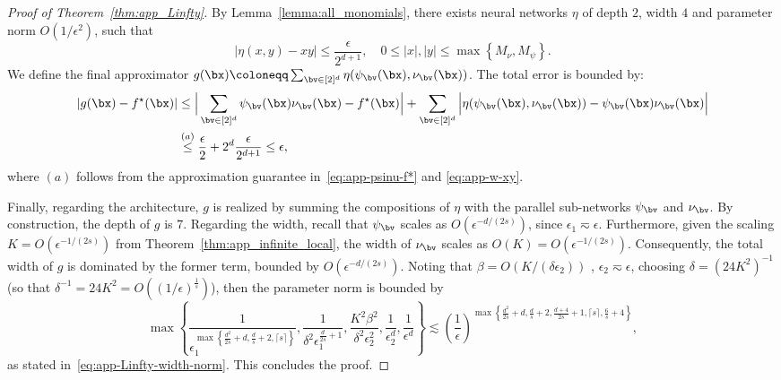 \documentclass[11pt]{article}
\begin{document}
\begin{proof}[Proof of Theorem~\ref{thm:app_Linfty}]
    By Lemma~\ref{lemma:all_monomials}, there exists neural networks $\eta$ of depth $2$, width $4$ and parameter norm $O(1 / \epsilon^2)$, such that 
    \begin{equation}
        |\eta(x,y) - xy| \leq \frac{\epsilon}{2^{d+1}}, \quad 0 \leq |x|, |y| \leq \max \left\{ M_{\nu}, M_{\psi}\right\}.
        \label{eq:app-w-xy}
    \end{equation}
    We define the final approximator $g(\bx) \coloneqq  \sum_{\bv \in [2]^d} \eta(\psi_{\bv}(\bx), \nu_{\bv}(\bx))$. The total error is bounded by: 
    \begin{equation*}
        \begin{aligned}
                |g(\bx) - f^{\star}(\bx)| & \leq  \Big| \sum_{\bv \in [2]^d} \psi_{\bv}(\bx) \nu_{\bv}(\bx)  - f^{\star}(\bx)\Big| + \sum_{\bv \in [2]^d}  \Big| \eta(\psi_{\bv}(\bx), \nu_{\bv}(\bx)) - \psi_{\bv}(\bx) \nu_{\bv}(\bx)  \Big| \\
                & \overset{(a)}{\leq} \frac{\epsilon}{2} + 2^d \frac{\epsilon}{2^{d+1}} \leq \epsilon,
        \end{aligned}
    \end{equation*}
    where $(a)$ follows from the approximation guarantee in~\eqref{eq:app-psinu-f*} and \eqref{eq:app-w-xy}.



    Finally, regarding the architecture, $g$ is realized by summing the compositions of $\eta$ with the parallel sub-networks $\psi_{\bv}$ and $\nu_{\bv}$. By construction, the depth of $g$ is $7$. Regarding the width, recall that $\psi_{\bv}$ scales as $O(\epsilon^{-d/(2s)})$, since $\epsilon_1 \eqsim \epsilon$. Furthermore, given the scaling $K = O(\epsilon^{-1/(2s)})$ from Theorem~\ref{thm:app_infinite_local}, the width of $\nu_{\bv}$ scales as $O(K) = O(\epsilon^{-1/(2s)})$. Consequently, the total width of $g$ is dominated by the former term, bounded by $O(\epsilon^{-d/(2s)})$.
    Noting that $\beta = O(K / (\delta \epsilon_2))$ , $\epsilon_2 \eqsim \epsilon$, choosing $\delta = (24K^2)^{-1}$ (so that $\delta^{-1} = 24 K^2 = O((1 / \epsilon)^{\frac{1}{s}})$), then the parameter norm is bounded by 
    \begin{equation*}
        \max \left\{ \frac{1}{\epsilon_1^{\max \left\{ \frac{d^2}{2s}+d, \frac{d}{s}+2, \lceil s\rceil \right\} }} ,\frac{1}{\delta^2 \epsilon_1^{\frac{d}{2s}+1}}, \frac{K^2 \beta^2}{\delta^2 \epsilon_2^2},\frac{1}{\epsilon_2^d}, \frac{1}{\epsilon^d}\right\} \lesssim \left( \frac{1}{\epsilon}\right)^{\max \left\{ \frac{d^2}{2s}+d, \frac{d}{s}+2, \frac{d+4}{2s}+1, \lceil s \rceil, \frac{6}{s}+4\right\}},
    \end{equation*}
    as stated in~\eqref{eq:app-Linfty-width-norm}. This concludes the proof.
\end{proof}
\end{document}
